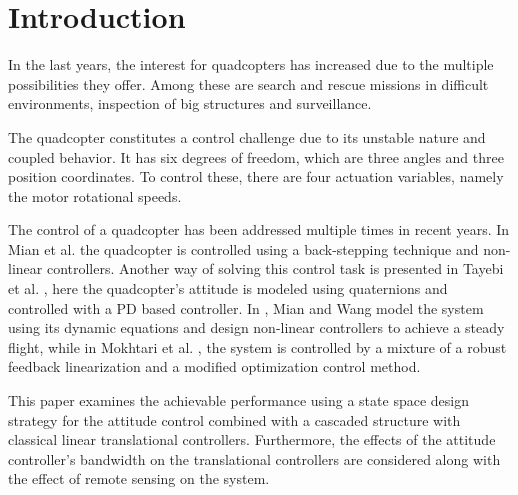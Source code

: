 \section{Introduction}
In the last years, the interest for quadcopters has increased due to the multiple possibilities they offer. Among these are search and rescue missions in difficult environments, inspection of big structures and surveillance. \nolinebreak\cite{droneuses}

The quadcopter constitutes a control challenge due to its unstable nature and coupled behavior. It has six degrees of freedom, which are three angles and three position coordinates. To control these, there are four actuation variables, namely the motor rotational speeds. \cite{draganflyer}

The control of a quadcopter has been addressed multiple times in recent years. In Mian et al. \cite{backstepping} the quadcopter is controlled using a back-stepping technique and non-linear controllers. Another way of solving this control task is presented in Tayebi et al. \cite{quaternionsPD}, here the quadcopter's attitude is modeled using quaternions and controlled with a PD based controller. In \cite{MianWang}, Mian and Wang model the system using its dynamic equations and design non-linear controllers to achieve a steady flight, while in Mokhtari et al. \cite{GHinf}, the system is controlled by a mixture of a robust feedback linearization and a modified optimization control method.

This paper examines the achievable performance using a state space design strategy for the attitude control combined with a cascaded structure with classical linear translational controllers. Furthermore, the effects of the attitude controller's bandwidth on the translational controllers are considered along with the effect of remote sensing on the system.
%

